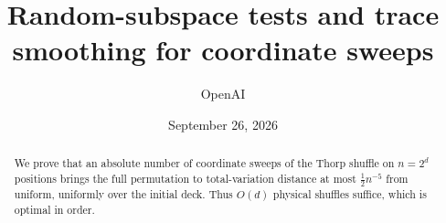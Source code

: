 \documentclass[11pt]{article}
\title{Random-subspace tests and trace smoothing for coordinate sweeps}
\author{OpenAI}
\date{September 26, 2026}
\theoremstyle{definition}
\theoremstyle{remark}
\begin{document}
\maketitle
\begin{abstract}
We prove that an absolute number of coordinate sweeps of the Thorp shuffle on $n=2^d$ positions brings the full permutation to total-variation distance at most $\frac12n^{-5}$ from uniform, uniformly over the initial deck. Thus $O(d)$ physical shuffles suffice, which is optimal in order.
\end{abstract}
\tableofcontents




\end{document}
